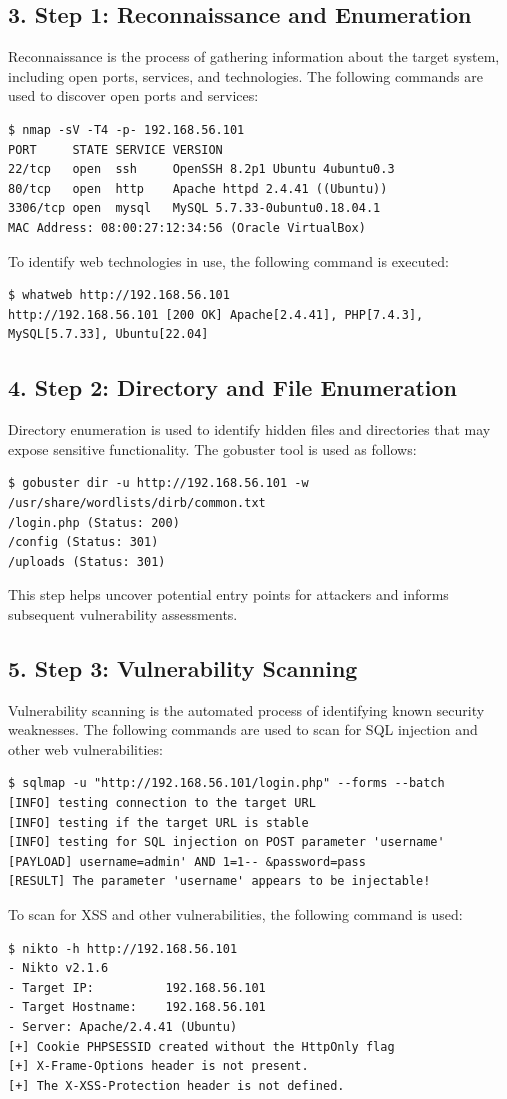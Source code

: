 \subsection*{3. Step 1: Reconnaissance and Enumeration}
Reconnaissance is the process of gathering information about the target system, including open ports, services, and technologies\cite{nist800154}. The following commands are used to discover open ports and services:
\begin{verbatim}
$ nmap -sV -T4 -p- 192.168.56.101
PORT     STATE SERVICE VERSION
22/tcp   open  ssh     OpenSSH 8.2p1 Ubuntu 4ubuntu0.3
80/tcp   open  http    Apache httpd 2.4.41 ((Ubuntu))
3306/tcp open  mysql   MySQL 5.7.33-0ubuntu0.18.04.1
MAC Address: 08:00:27:12:34:56 (Oracle VirtualBox)
\end{verbatim}
To identify web technologies in use, the following command is executed:
\begin{verbatim}
$ whatweb http://192.168.56.101
http://192.168.56.101 [200 OK] Apache[2.4.41], PHP[7.4.3], MySQL[5.7.33], Ubuntu[22.04]
\end{verbatim}

\subsection*{4. Step 2: Directory and File Enumeration}
Directory enumeration is used to identify hidden files and directories that may expose sensitive functionality\cite{owasp}. The gobuster tool is used as follows:
\begin{verbatim}
$ gobuster dir -u http://192.168.56.101 -w /usr/share/wordlists/dirb/common.txt
/login.php (Status: 200)
/config (Status: 301)
/uploads (Status: 301)
\end{verbatim}
This step helps uncover potential entry points for attackers and informs subsequent vulnerability assessments.

\subsection*{5. Step 3: Vulnerability Scanning}
Vulnerability scanning is the automated process of identifying known security weaknesses\cite{nist800154}. The following commands are used to scan for SQL injection and other web vulnerabilities:
\begin{verbatim}
$ sqlmap -u "http://192.168.56.101/login.php" --forms --batch
[INFO] testing connection to the target URL
[INFO] testing if the target URL is stable
[INFO] testing for SQL injection on POST parameter 'username'
[PAYLOAD] username=admin' AND 1=1-- &password=pass
[RESULT] The parameter 'username' appears to be injectable!
\end{verbatim}
To scan for XSS and other vulnerabilities, the following command is used:
\begin{verbatim}
$ nikto -h http://192.168.56.101
- Nikto v2.1.6
- Target IP:          192.168.56.101
- Target Hostname:    192.168.56.101
- Server: Apache/2.4.41 (Ubuntu)
[+] Cookie PHPSESSID created without the HttpOnly flag
[+] X-Frame-Options header is not present.
[+] The X-XSS-Protection header is not defined.
\end{verbatim}

